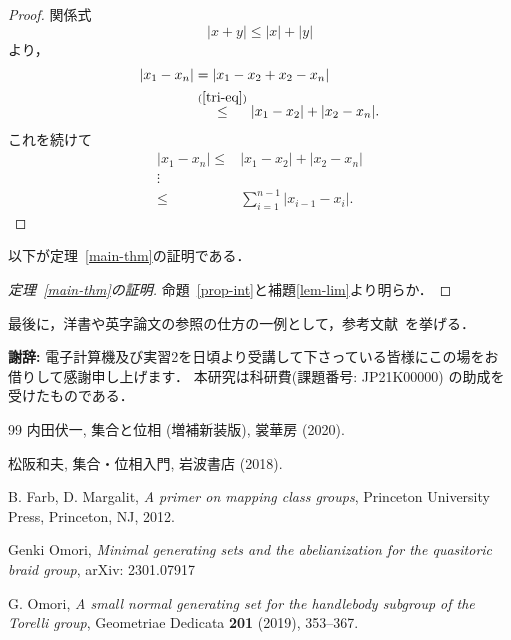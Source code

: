 \documentclass{amsart}
\theoremstyle{plain}%
\theoremstyle{definition}%
\theoremstyle{remark}%
\theoremstyle{definition}%
\theoremstyle{remark}%
\begin{document}
\begin{proof}
関係式
\begin{equation}
|x+y|\leq |x|+|y|\label{tri-eq}
\end{equation}
より，
\begin{align*}
|x_1-x_n|&=|x_1-x_2+x_2-x_n|\\
&\stackrel{(\ref{tri-eq})}{\leq }|x_1-x_2|+|x_2-x_n|.
\end{align*}
これを続けて
\begin{align*}
|x_1-x_n|\leq &|x_1-x_2|+|x_2-x_n|\\
\vdots &\\
\leq & \sum _{i=1}^{n-1}|x_{i-1}-x_i|.
\end{align*}

\end{proof}



以下が定理~\ref{main-thm}の証明である．

\begin{proof}[定理~\ref{main-thm}の証明]
命題~\ref{prop-int}と補題\ref{lem-lim}より明らか．
\end{proof}


最後に，洋書や英字論文の参照の仕方の一例として，参考文献~\cite{Farb-Margalit, Omori1, Omori2}を挙げる．


\par
{\bf 謝辞:} 電子計算機及び実習2を日頃より受講して下さっている皆様にこの場をお借りして感謝申し上げます．
本研究は科研費(課題番号: JP21K00000) の助成を受けたものである．

\begin{thebibliography}{99}
内田伏一, 集合と位相 (増補新装版), 裳華房 (2020).

松阪和夫, 集合・位相入門, 岩波書店 (2018).

B. Farb, D. Margalit, \emph{A primer on mapping class groups}, Princeton University Press, Princeton, NJ, 2012.

Genki Omori, \emph{Minimal generating sets and the abelianization for the quasitoric braid group}, arXiv: 2301.07917

G. Omori, \emph{A small normal generating set for the handlebody subgroup of the Torelli group}, Geometriae Dedicata \textbf{201} (2019), 353--367.
\end{thebibliography}
\end{document}
